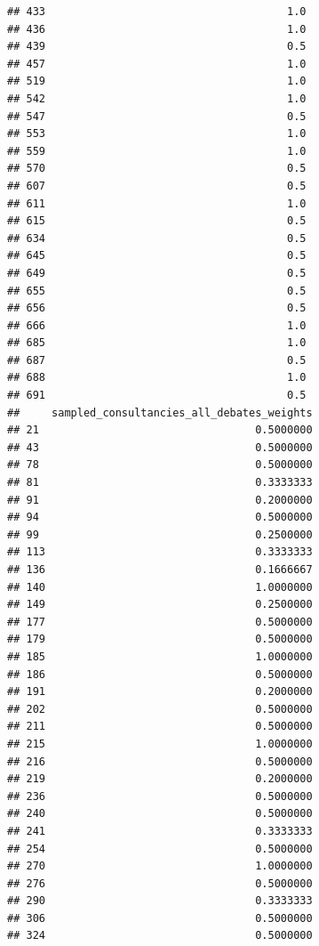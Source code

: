 \documentclass[
]{article}
\begin{document}
\begin{verbatim}
## 433                                      1.0
## 436                                      1.0
## 439                                      0.5
## 457                                      1.0
## 519                                      1.0
## 542                                      1.0
## 547                                      0.5
## 553                                      1.0
## 559                                      1.0
## 570                                      0.5
## 607                                      0.5
## 611                                      1.0
## 615                                      0.5
## 634                                      0.5
## 645                                      0.5
## 649                                      0.5
## 655                                      0.5
## 656                                      0.5
## 666                                      1.0
## 685                                      1.0
## 687                                      0.5
## 688                                      1.0
## 691                                      0.5
##     sampled_consultancies_all_debates_weights
## 21                                  0.5000000
## 43                                  0.5000000
## 78                                  0.5000000
## 81                                  0.3333333
## 91                                  0.2000000
## 94                                  0.5000000
## 99                                  0.2500000
## 113                                 0.3333333
## 136                                 0.1666667
## 140                                 1.0000000
## 149                                 0.2500000
## 177                                 0.5000000
## 179                                 0.5000000
## 185                                 1.0000000
## 186                                 0.5000000
## 191                                 0.2000000
## 202                                 0.5000000
## 211                                 0.5000000
## 215                                 1.0000000
## 216                                 0.5000000
## 219                                 0.2000000
## 236                                 0.5000000
## 240                                 0.5000000
## 241                                 0.3333333
## 254                                 0.5000000
## 270                                 1.0000000
## 276                                 0.5000000
## 290                                 0.3333333
## 306                                 0.5000000
## 324                                 0.5000000

\end{verbatim}
\end{document}
